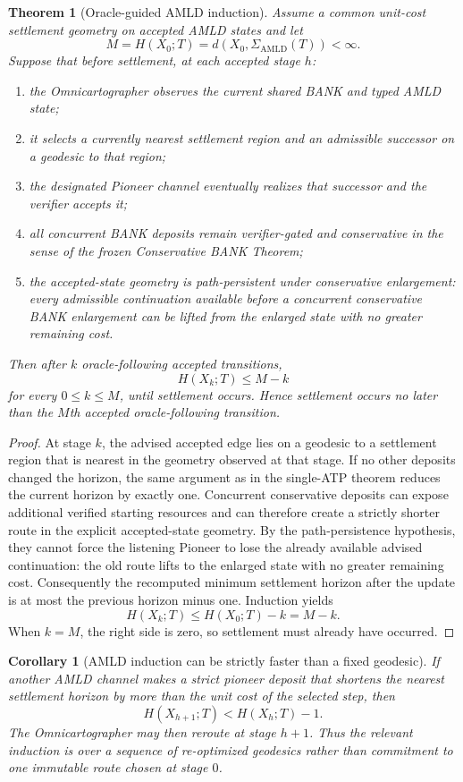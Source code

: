 \documentclass[11pt]{article}
\newtheorem{theorem}[definition]{Theorem}
\newtheorem{corollary}[definition]{Corollary}
\theoremstyle{remark}
\newcommand{\AMLD}{\mathrm{AMLD}}
\newcommand{\Sett}{\Sigma}
\begin{document}
\begin{theorem}[Oracle-guided AMLD induction]
Assume a common unit-cost settlement geometry on accepted AMLD states and let
\[
M=H(X_0;T)=d(X_0,\Sett_{\AMLD}(T))<\infty.
\]
Suppose that before settlement, at each accepted stage $h$:
\begin{enumerate}[label=(\roman*)]
\item the Omnicartographer observes the current shared BANK and typed AMLD state;
\item it selects a currently nearest settlement region and an admissible successor on a geodesic to that region;
\item the designated Pioneer channel eventually realizes that successor and the verifier accepts it;
\item all concurrent BANK deposits remain verifier-gated and conservative in the sense of the frozen Conservative BANK Theorem;
\item the accepted-state geometry is \emph{path-persistent under conservative enlargement}: every admissible continuation available before a concurrent conservative BANK enlargement can be lifted from the enlarged state with no greater remaining cost.
\end{enumerate}
Then after $k$ oracle-following accepted transitions,
\[
H(X_k;T)\le M-k
\]
for every $0\le k\le M$, until settlement occurs. Hence settlement occurs no later than the $M$th accepted oracle-following transition.
\end{theorem}
\begin{proof}
At stage $k$, the advised accepted edge lies on a geodesic to a settlement region that is nearest in the geometry observed at that stage. If no other deposits changed the horizon, the same argument as in the single-ATP theorem reduces the current horizon by exactly one. Concurrent conservative deposits can expose additional verified starting resources and can therefore create a strictly shorter route in the explicit accepted-state geometry. By the path-persistence hypothesis, they cannot force the listening Pioneer to lose the already available advised continuation: the old route lifts to the enlarged state with no greater remaining cost. Consequently the recomputed minimum settlement horizon after the update is at most the previous horizon minus one. Induction yields
\[
H(X_k;T)\le H(X_0;T)-k=M-k.
\]
When $k=M$, the right side is zero, so settlement must already have occurred.
\end{proof}

\begin{corollary}[AMLD induction can be strictly faster than a fixed geodesic]
If another AMLD channel makes a strict pioneer deposit that shortens the nearest settlement horizon by more than the unit cost of the selected step, then
\[
H(X_{h+1};T)<H(X_h;T)-1.
\]
The Omnicartographer may then reroute at stage $h+1$. Thus the relevant induction is over a sequence of re-optimized geodesics rather than commitment to one immutable route chosen at stage $0$.
\end{corollary}
\end{document}
